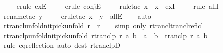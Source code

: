 \begin{isabellebody}
\ \ \ \isamarkupfalse%
\ {\isacharparenleft}{\kern0pt}erule\ exE{\isacharparenright}{\kern0pt}\isanewline
\ \ \ \isamarkupfalse%
\ {\isacharparenleft}{\kern0pt}erule\ conjE{\isacharparenright}{\kern0pt}\isanewline
\ \ \ \isamarkupfalse%
\ {\isacharparenleft}{\kern0pt}rule{\isacharunderscore}{\kern0pt}tac\ x\ {\isacharequal}{\kern0pt}\ x\ \ exI{\isacharparenright}{\kern0pt}\isanewline
\ \ \ \isamarkupfalse%
\ {\isacharparenleft}{\kern0pt}rule\ allI{\isacharparenright}{\kern0pt}\isanewline
\ \ \ \isamarkupfalse%
\ {\isacharparenleft}{\kern0pt}rename{\isacharunderscore}{\kern0pt}tac\ y{\isacharparenright}{\kern0pt}\isanewline
\ \ \ \isamarkupfalse%
\ {\isacharparenleft}{\kern0pt}erule{\isacharunderscore}{\kern0pt}tac\ x\ {\isacharequal}{\kern0pt}\ y\ \ allE{\isacharparenright}{\kern0pt}\isanewline
\ \ \isamarkupfalse%
\ auto%
\endisatagproof
{\isafoldproof}%
%
\isadelimproof
\isanewline
%
\endisadelimproof
\isanewline
{}\isamarkupfalse%
\ rtrancl{\isacharunderscore}{\kern0pt}unfold{\isacharbrackleft}{\kern0pt}nitpick{\isacharunderscore}{\kern0pt}unfold{\isacharbrackright}{\kern0pt}{\isacharcolon}{\kern0pt}\ {\isachardoublequoteopen}r\isactrlsup {\isacharasterisk}{\kern0pt}\ {\isasymequiv}\ {\isacharparenleft}{\kern0pt}r\isactrlsup {\isacharplus}{\kern0pt}{\isacharparenright}{\kern0pt}\isactrlsup {\isacharequal}{\kern0pt}{\isachardoublequoteclose}\isanewline
%
\isadelimproof
\ \ %
\endisadelimproof
%
\isatagproof
{}\isamarkupfalse%
\ {\isacharparenleft}{\kern0pt}simp\ only{\isacharcolon}{\kern0pt}\ rtrancl{\isacharunderscore}{\kern0pt}trancl{\isacharunderscore}{\kern0pt}reflcl{\isacharparenright}{\kern0pt}%
\endisatagproof
{\isafoldproof}%
%
\isadelimproof
\isanewline
%
\endisadelimproof
\isanewline
{}\isamarkupfalse%
\ rtranclp{\isacharunderscore}{\kern0pt}unfold{\isacharbrackleft}{\kern0pt}nitpick{\isacharunderscore}{\kern0pt}unfold{\isacharbrackright}{\kern0pt}{\isacharcolon}{\kern0pt}\ {\isachardoublequoteopen}rtranclp\ r\ a\ b\ {\isasymequiv}\ {\isacharparenleft}{\kern0pt}a\ {\isacharequal}{\kern0pt}\ b\ {\isasymor}\ tranclp\ r\ a\ b{\isacharparenright}{\kern0pt}{\isachardoublequoteclose}\isanewline
%
\isadelimproof
\ \ %
\endisadelimproof
%
\isatagproof
{}\isamarkupfalse%
\ {\isacharparenleft}{\kern0pt}rule\ eq{\isacharunderscore}{\kern0pt}reflection{\isacharparenright}{\kern0pt}\ {\isacharparenleft}{\kern0pt}auto\ dest{\isacharcolon}{\kern0pt}\ rtranclpD{\isacharparenright}{\kern0pt}%

\end{isabellebody}
